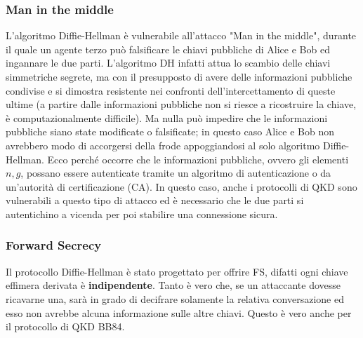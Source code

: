 \subsubsection{Man in the middle}
L'algoritmo Diffie-Hellman è vulnerabile all'attacco "Man in the middle", durante il quale un agente terzo può falsificare le chiavi pubbliche di Alice e Bob ed ingannare le due parti. L'algoritmo DH infatti attua lo scambio delle chiavi simmetriche segrete, ma con il presupposto di avere delle informazioni pubbliche condivise e si dimostra resistente nei confronti dell'intercettamento di queste ultime (a partire dalle informazioni pubbliche non si riesce a ricostruire la chiave, è computazionalmente difficile). Ma nulla può impedire che le informazioni pubbliche siano state modificate o falsificate; in questo caso Alice e Bob non avrebbero modo di accorgersi della frode appoggiandosi al solo algoritmo Diffie-Hellman. Ecco perché occorre che le informazioni pubbliche, ovvero gli elementi $n, g$, possano essere autenticate tramite un algoritmo di autenticazione o da un'autorità di certificazione (CA).
In questo caso, anche i protocolli di QKD sono vulnerabili a questo tipo di attacco ed è necessario che le due parti si autentichino a vicenda per poi stabilire una connessione sicura.

\subsubsection{Forward Secrecy}
Il protocollo Diffie-Hellman è stato progettato per offrire FS, difatti ogni chiave effimera derivata è \textbf{indipendente}. Tanto è vero che, se un attaccante dovesse ricavarne una, sarà in grado di decifrare solamente la relativa conversazione ed esso non avrebbe alcuna informazione sulle altre chiavi. Questo è vero anche per il protocollo di QKD BB84.

